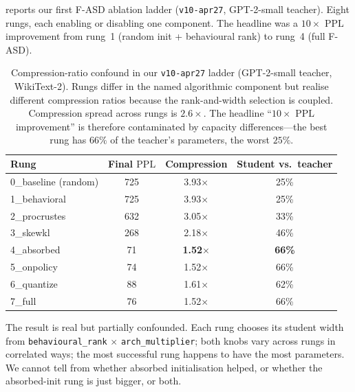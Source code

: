 \documentclass[11pt]{article}
\newcommand{\PPL}{\ensuremath{\mathrm{PPL}}}
\newcommand{\fasd}{\textsc{F-ASD}}
\begin{document}
 reports our first \fasd{} ablation ladder
(\texttt{v10-apr27}, GPT-2-small teacher). Eight rungs, each enabling or
disabling one component. The headline was a $10\times$ \PPL{} improvement
from rung~1 (random init + behavioural rank) to rung~4 (full \fasd{}).

\begin{table}[t]
\centering
\small
\caption{Compression-ratio confound in our \texttt{v10-apr27} ladder
(GPT-2-small teacher, WikiText-2). Rungs differ in the named algorithmic
component but realise different compression ratios because the
rank-and-width selection is coupled. Compression spread across rungs is
$2.6\times$. The headline ``$10\times$ \PPL{} improvement'' is therefore
contaminated by capacity differences---the best rung has $66\%$ of the
teacher's parameters, the worst $25\%$.}
\label{tab:v10-confound}
\begin{tabular}{lccc}
\toprule
Rung                        & Final \PPL & Compression          & Student vs.\ teacher \\
\midrule
0\_baseline (random)        & 725 & 3.93$\times$ & \phantom{0}25\% \\
1\_behavioral               & 725 & 3.93$\times$ & \phantom{0}25\% \\
2\_procrustes               & 632 & 3.05$\times$ & \phantom{0}33\% \\
3\_skewkl                   & 268 & 2.18$\times$ & \phantom{0}46\% \\
4\_absorbed                 &  71 & \textbf{1.52$\times$} & \textbf{66\%} \\
5\_onpolicy                 &  74 & 1.52$\times$ & \phantom{0}66\% \\
6\_quantize                 &  88 & 1.61$\times$ & \phantom{0}62\% \\
7\_full                     &  76 & 1.52$\times$ & \phantom{0}66\% \\
\bottomrule
\end{tabular}
\end{table}

The result is real but partially confounded. Each rung chooses its
student width from \texttt{behavioural\_rank} $\times$
\texttt{arch\_multiplier}; both knobs vary across rungs in correlated
ways; the most successful rung happens to have the most parameters. We
cannot tell from  whether absorbed initialisation
helped, or whether the absorbed-init rung is just bigger, or both.
\end{document}
